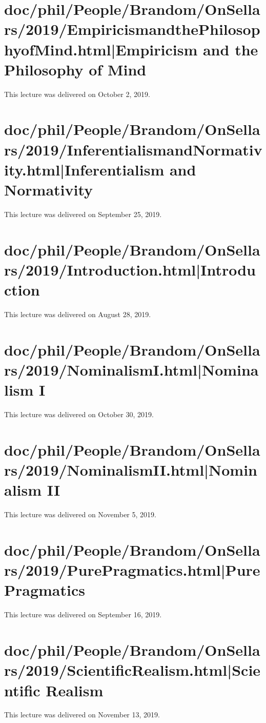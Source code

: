 \documentclass[12pt,a4paper]{report}
\begin{document}
\part{doc/phil/People/Brandom/OnSellars/2019/EmpiricismandthePhilosophyofMind.html|Empiricism and the Philosophy of Mind}
This lecture was delivered on October 2, 2019.

\part{doc/phil/People/Brandom/OnSellars/2019/InferentialismandNormativity.html|Inferentialism and Normativity}
This lecture was delivered on September 25, 2019.

\part{doc/phil/People/Brandom/OnSellars/2019/Introduction.html|Introduction}
This lecture was delivered on August 28, 2019.

\part{doc/phil/People/Brandom/OnSellars/2019/NominalismI.html|Nominalism I}
This lecture was delivered on October 30, 2019.

\part{doc/phil/People/Brandom/OnSellars/2019/NominalismII.html|Nominalism II}
This lecture was delivered on November 5, 2019.

\part{doc/phil/People/Brandom/OnSellars/2019/PurePragmatics.html|Pure Pragmatics}
This lecture was delivered on September 16, 2019.

\part{doc/phil/People/Brandom/OnSellars/2019/ScientificRealism.html|Scientific Realism}
This lecture was delivered on November 13, 2019.
\end{document}
